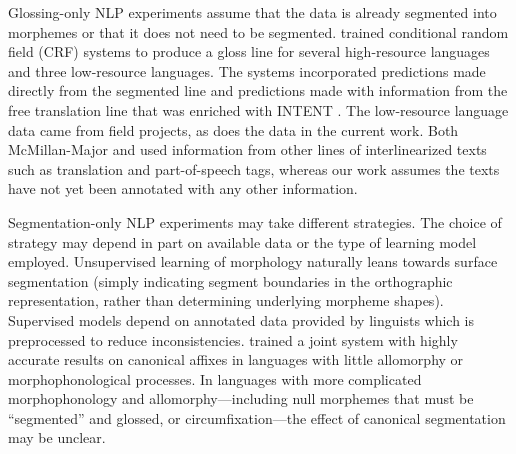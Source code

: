 Glossing-only NLP experiments assume that the data is already segmented into morphemes or that it does not need to be segmented. 
\citet{mcmillan-major_automating_2020} trained conditional random field (CRF) systems to produce a gloss line for several high-resource languages and three low-resource languages. The systems incorporated predictions made directly from the segmented line and predictions made with information from the free translation line that was enriched with INTENT \citet{georgi_aari_2016}. The low-resource language data came from field projects, as does the data in the current work. Both McMillan-Major and \citet{samardzic_automatic_2015} used information from other lines of interlinearized texts such as translation and part-of-speech tags, whereas our work assumes the texts have not yet been annotated with any other information.

Segmentation-only NLP experiments may take different strategies. The choice of strategy may depend in part on available data or the type of learning model employed. Unsupervised learning of morphology naturally leans towards surface segmentation (simply indicating segment boundaries in the orthographic representation, rather than determining underlying morpheme shapes). Supervised models depend on annotated data provided by linguists which is preprocessed to reduce inconsistencies. \citet{moeller_automatic_2018} trained a joint system with highly accurate results on canonical affixes in languages with little allomorphy or morphophonological processes.
In languages with more complicated morphophonology and allomorphy---including null morphemes that must be ``segmented'' and glossed, or circumfixation---the effect of canonical segmentation may be unclear.

